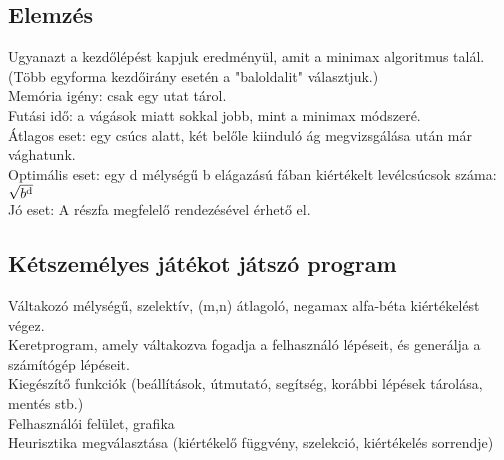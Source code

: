 \documentclass{article}
\begin{document}
	 \subsection{Elemzés}
	 Ugyanazt a kezdőlépést kapjuk eredményül, amit a minimax algoritmus talál. (Több egyforma kezdőirány esetén a "baloldalit" választjuk.)\\
	 Memória igény: csak egy utat tárol.\\
	 Futási idő: a vágások miatt sokkal jobb, mint a minimax módszeré.\\
	 Átlagos eset: egy csúcs alatt, két belőle kiinduló ág megvizsgálása után már vághatunk.\\
	 Optimális eset: egy d mélységű b elágazású fában kiértékelt levélcsúcsok száma: $\sqrt{b\textsuperscript{d}}$\\
	 Jó eset: A részfa megfelelő rendezésével érhető el.
	 
	 \subsection{Kétszemélyes játékot játszó program}
	 Váltakozó mélységű, szelektív, (m,n) átlagoló, negamax alfa-béta kiértékelést végez.\\
	 Keretprogram, amely váltakozva fogadja a felhasználó lépéseit, és generálja a számítógép lépéseit.\\
	 Kiegészítő funkciók (beállítások, útmutató, segítség, korábbi lépések tárolása, mentés stb.)\\
	 Felhasználói felület, grafika\\
	 Heurisztika megválasztása (kiértékelő függvény, szelekció, kiértékelés sorrendje)\\
	 
	 
	
		
\end{document}
